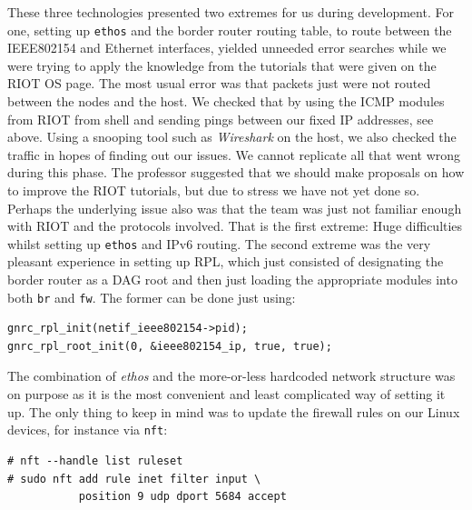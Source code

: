 \documentclass[acmtog, language=english, nonacm]{acmart}
\begin{document}
    These three technologies presented two extremes for us during development. For one, setting up \texttt{ethos} and the border router routing table, to route between the IEEE802154 and Ethernet interfaces, yielded unneeded error searches while we were trying to apply the knowledge from the tutorials that were given on the RIOT OS page. The most usual error was that packets just were not routed between the nodes and the host. We checked that by using the ICMP modules from RIOT from shell and sending pings between our fixed IP addresses, see above. Using a snooping tool such as \emph{Wireshark} on the host, we also checked the traffic in hopes of finding out our issues. We cannot replicate all that went wrong during this phase. The professor suggested that we should make proposals on how to improve the RIOT tutorials, but due to stress we have not yet done so. Perhaps the underlying issue also was that the team was just not familiar enough with RIOT and the protocols involved. That is the first extreme: Huge difficulties whilst setting up \texttt{ethos} and IPv6 routing. The second extreme was the very pleasant experience in setting up RPL, which just consisted of designating the border router as a DAG root and then just loading the appropriate modules into both \texttt{br} and \texttt{fw}. The former can be done just using:

    \begin{minipage}{\linewidth}
        \begin{verbatim}
gnrc_rpl_init(netif_ieee802154->pid);
gnrc_rpl_root_init(0, &ieee802154_ip, true, true);
        \end{verbatim}
    \end{minipage}

    The combination of \emph{ethos} and the more-or-less hardcoded network structure was on purpose as it is the most convenient and least complicated way of setting it up. The only thing to keep in mind was to update the firewall rules on our Linux devices, for instance via \texttt{nft}:
    \begin{verbatim}
# nft --handle list ruleset
# sudo nft add rule inet filter input \
           position 9 udp dport 5684 accept
    \end{verbatim}
\end{document}
